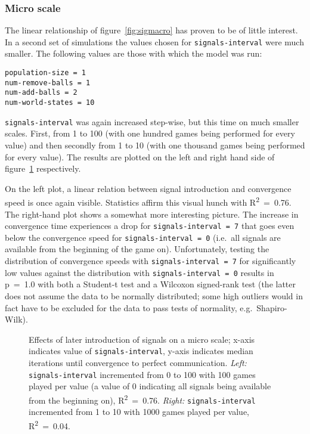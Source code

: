 \documentclass[
	DIV=calc,
	BCOR=0mm,
	pagesize,
	titlepage
]{scrartcl}
\newcommand{\code}[1]{\texttt{#1}}
\begin{document}
\subsubsection*{Micro scale}
The linear relationship of figure~\ref{fig:sigmacro} has proven to be of little interest.
In a second set of simulations the values chosen for \code{signals-interval} were much smaller.
The following values are those with which the model was run:
\begin{verbatim}
population-size = 1
num-remove-balls = 1
num-add-balls = 2
num-world-states = 10
\end{verbatim}
\code{signals-interval} was again increased step-wise, but this time on much smaller scales.
First, from 1 to 100 (with one hundred games being performed for every value) and then secondly from 1 to 10 (with one thousand games being performed for every value).
The results are plotted on the left and right hand side of figure~\ref{fig:sigmicro} respectively.

On the left plot, a linear relation between signal introduction and convergence speed is once again visible.
Statistics affirm this visual hunch with R\textsuperscript{2}~=~0.76.
The right-hand plot shows a somewhat more interesting picture.
The increase in convergence time experiences a drop for \code{signals-interval~=~7} that goes even below the convergence speed for \code{signals-interval~=~0} (i.e.~all signals are available from the beginning of the game on).
Unfortunately, testing the distribution of convergence speeds with \code{signals-interval~=~7} for significantly low values against the distribution with \code{signals-interval~=~0} results in p~=~1.0 with both a Student-t test and a Wilcoxon signed-rank test (the latter does not assume the data to be normally distributed; some high outliers would in fact have to be excluded for the data to pass tests of normality, e.g.~Shapiro-Wilk).

\begin{figure}
	\centering
	\caption{Effects of later introduction of signals on a micro scale; x-axis indicates value of \code{signals-interval}, y-axis indicates median iterations until convergence to perfect communication. \emph{Left:} \code{signals-interval} incremented from 0 to 100 with 100 games played per value (a value of 0 indicating all signals being available from the beginning on), R\textsuperscript{2}~=~0.76. \emph{Right:} \code{signals-interval} incremented from 1 to 10 with 1000 games played per value, R\textsuperscript{2}~=~0.04.}
	\label{fig:sigmicro}
\end{figure}
\end{document}
